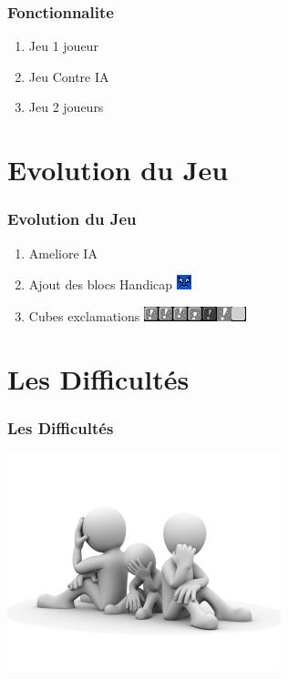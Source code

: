 \documentclass{beamer}
\begin{document}
\begin{darkframes}
 \begin{frame}
 	 \frametitle{Fonctionnalite}
 	   \begin{enumerate}
    \item Jeu 1 joueur 
    \item Jeu Contre IA
    \item Jeu 2 joueurs 
  \end{enumerate}
    \end{frame}
    
     \section{Evolution du Jeu}
 \begin{frame}
  \frametitle{Evolution du Jeu}
 	   \begin{enumerate}
    \item Ameliore IA
    \item Ajout des blocs Handicap
    \includegraphics[scale=1.5]{./Image/brique.png}\\%
    \item Cubes exclamations
    \includegraphics[scale=1.5]{./Image/grey.png}\\%
  \end{enumerate}
    \end{frame}


     \section{Les Difficultés}
 \begin{frame}
  \frametitle{Les Difficultés}
   	 \begin{center}
  \includegraphics[scale=0.60]{./Image/difficulte.png}
  		\end{center}
    \end{frame}
    

\end{darkframes}
\end{document}
